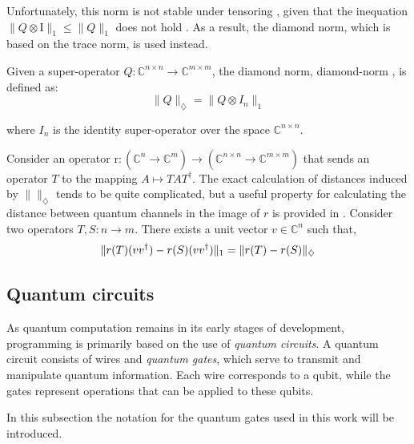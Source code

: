 Unfortunately, this norm is not stable under tensoring , given that the inequation $ \lVert Q \otimes \text{I} \rVert_{1} \leq \lVert Q \rVert_{1}$ does not hold \cite{watrous2018theory}. As a result, the diamond norm, which is based on the trace norm, is used instead. 

\begin{definition}
  Given a super-operator $Q: \mathbb{C}^{n\times n} \xrightarrow{} \mathbb{C}^{m\times m }$, the diamond norm, \gls{diamond-norm} , is defined as:
  \begin{equation}  \label{eq:diamond_distance}
    \lVert Q \rVert_{\diamondsuit} =  \lVert Q \otimes I_{n} \rVert_{1}
  \end{equation}
\end{definition}
where $I_{n} $ is the identity super-operator over the space $\mathbb{C}^{n\times n}$.



Consider an operator  $ \text{r} : (\mathbb{C}^{n} \xrightarrow[]{} \mathbb{C}^{m}) \xrightarrow[]{} (\mathbb{C}^{n\times n}\xrightarrow[]{} \mathbb{C}^{m\times m})$ that sends an operator $T$ to the mapping $A \mapsto TAT^{\dag}$. The exact calculation of distances induced by $\lVert \rVert_{\diamondsuit}$ tends to be quite complicated, but a useful property for calculating the distance between quantum channels in the image of $r$ is provided in \cite{watrous2018theory}.
Consider two operators $T, S : n \xrightarrow{} m$. There exists a unit vector $v \in \mathbb{C}^{n}$ such that, 
\begin{equation} \label{eq:norm_iso_r}
\begin{centering}
\lVert r(T) (vv^{\dag})-r(S) (vv^{\dag}) \rVert_{1} = \lVert r(T)-r(S) \rVert_{\diamondsuit}
 \end{centering}
\end{equation}

\subsection{Quantum circuits}
As quantum computation remains in its early stages of development, programming is primarily based on the use of \emph{quantum circuits}. A quantum circuit consists of wires and \emph{quantum gates}, which serve to transmit and manipulate quantum information. Each wire corresponds to a qubit, while the gates represent operations that can be applied to these qubits. 

In this subsection the notation for the quantum gates used in this work will be introduced.

